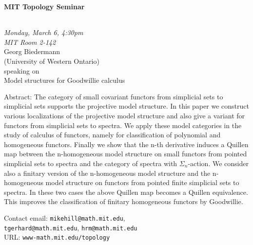 \documentclass{slides}
\begin{document}
\begin{center}

{\fontsize {54pt}{40pt}\selectfont

\textrm{
{\textbf{MIT Topology Seminar}}}
}\\
\vspace{.5cm}
{\large\textrm{\emph{Monday, March 6, 4:30pm\\MIT Room 2-142}}}\\
\vspace{.5cm}
\textrm{{\Large Georg Biedermann  \\[.5cm](University of Western Ontario)}}\\
\vspace{.5cm} %
\textrm{speaking on}\\ %
\vspace{5mm}
\textrm{{\Large Model structures for Goodwillie calculus}}
\\
\end{center}
\vspace{.5cm}
{\small
Abstract:  The category of small covariant functors from simplicial sets to
 simplicial sets supports the projective model structure. In this paper
 we construct various localizations of the projective model structure and
 also give a variant for functors from simplicial sets to spectra. We
 apply these model categories in the study of calculus of functors,
 namely for classification of polynomial and homogeneous functors.
 Finally we show that the n-th derivative induces a Quillen map between
 the n-homogeneous model structure on small functors from pointed
 simplicial sets to spectra and the category of spectra with
 $\Sigma_n$-action. We consider also a finitary version of the
 n-homogeneous model structure and the n-homogeneous model structure on
 functors from pointed finite simplicial sets to spectra. In these two
 cases the above Quillen map becomes a Quillen equivalence. This improves
 the classification of finitary homogeneous functors by Goodwillie.


\textrm{Contact email: } \texttt{mikehill@math.mit.edu}, 
\\ \texttt{tgerhard@math.mit.edu}, \texttt{hrm@math.mit.edu}\\
\textrm{URL: } \texttt{www-math.mit.edu/topology}
}
\end{document}
